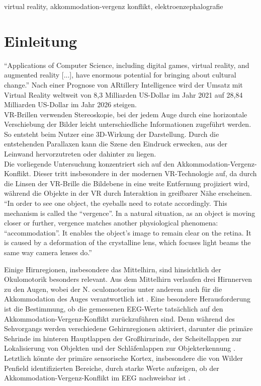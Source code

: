 \documentclass[conference]{IEEEtran}
\begin{document}
\begin{IEEEkeywords}
virtual reality, akkommodation-vergenz konflikt, elektroenzephalografie
\end{IEEEkeywords}

\section{Einleitung}
“Applications of Computer Science, including digital games, virtual reality, and augmented reality [...], have enormous potential for bringing about cultural change.” \cite{b3} Nach einer Prognose von ARtillery Intelligence wird der Umsatz mit Virtual Reality weltweit von 8,3 Milliarden US-Dollar im Jahr 2021 auf 28,84 Milliarden US-Dollar im Jahr 2026 steigen. \cite{b2}\\
VR-Brillen verwenden Stereoskopie, bei der jedem Auge durch eine horizontale Verschiebung der Bilder leicht unterschiedliche Informationen zugeführt werden. So entsteht beim Nutzer eine 3D-Wirkung der Darstellung. Durch die entstehenden Parallaxen kann die Szene den Eindruck erwecken, aus der Leinwand hervorzutreten oder dahinter zu liegen.\cite{b4}\\
Die vorliegende Untersuchung konzentriert sich auf den Akkommodation-Vergenz-Konflikt. Dieser tritt insbesondere in der modernen VR-Technologie auf, da durch die Linsen der VR-Brille die Bildebene in eine weite Entfernung projiziert wird, während die Objekte in der VR durch Interaktion in greifbarer Nähe erscheinen.
“In order to see one object, the eyeballs need to rotate accordingly. This mechanism is called the “vergence”. In a natural situation, as an object is moving closer or further, vergence matches another physiological phenomena: “accommodation”. It enables the object’s image to remain clear on the retina. It is caused by a deformation of the crystalline lens, which focuses light beams the same way camera lenses do.”\cite{b1}

Einige Hirnregionen, insbesondere das Mittelhirn, sind hinsichtlich der Okulomotorik besonders relevant. Aus dem Mittelhirn verlaufen drei Hirnnerven zu den Augen, wobei der N. oculomotorius unter anderem auch für die Akkommodation des Auges verantwortlich ist \cite{b6}. Eine besondere Herausforderung ist die Bestimmung, ob die gemessenen EEG-Werte tatsächlich auf den Akkommodation-Vergenz-Konflikt zurückzuführen sind. Denn während des Sehvorgangs werden verschiedene Gehirnregionen aktiviert, darunter die primäre Sehrinde im hinteren Hauptlappen der Großhirnrinde, der Scheitellappen zur Lokalisierung von Objekten und der Schläfenlappen zur Objekterkennung \cite{b8}. Letztlich könnte der primäre sensorische Kortex, insbesondere die von Wilder Penfield identifizierten Bereiche, durch starke Werte aufzeigen, ob der Akkommodation-Vergenz-Konflikt im EEG nachweisbar ist \cite{b7}.
\end{document}

